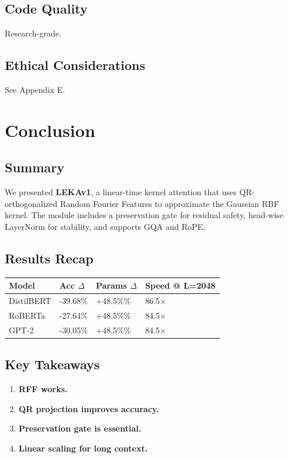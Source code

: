 \subsection{Code Quality}

Research-grade.

\subsection{Ethical Considerations}

See Appendix E.



\section{Conclusion}

\subsection{Summary}

We presented \textbf{LEKAv1}, a linear-time kernel attention that uses 
QR-orthogonalized Random Fourier Features to approximate the Gaussian 
RBF kernel. The module includes a preservation gate for residual safety, 
head-wise LayerNorm for stability, and supports GQA and RoPE.

\subsection{Results Recap}

\begin{table}[H]
\centering
\small
\begin{tabular}{llll}
\toprule
\textbf{Model} & \textbf{Acc $\Delta$} & \textbf{Params $\Delta$} & \textbf{Speed @ L=2048} \\
\midrule
DistilBERT & -39.68\% & +48.5\%\% & 86.5$\times$ \\
RoBERTa & -27.64\% & +48.5\%\% & 84.5$\times$ \\
GPT-2 & -30.05\% & +48.5\%\% & 84.5$\times$ \\
\bottomrule
\end{tabular}
\end{table}

\subsection{Key Takeaways}

\begin{enumerate}
\item \textbf{RFF works.}
\item \textbf{QR projection improves accuracy.}
\item \textbf{Preservation gate is essential.}
\item \textbf{Linear scaling for long context.}

\end{enumerate}
